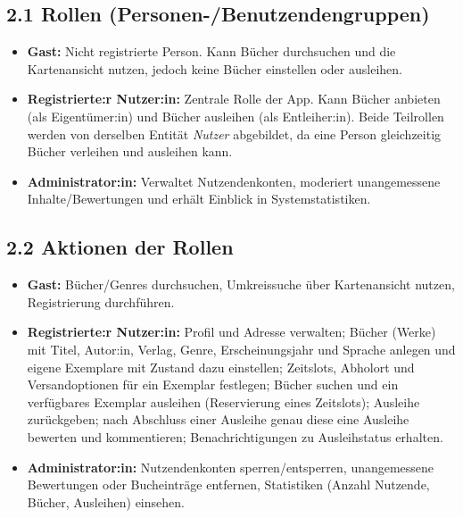 \documentclass[11pt,a4paper]{article}
\begin{document}
\subsection*{2.1 Rollen (Personen-/Benutzendengruppen)}
\begin{itemize}
    \item \textbf{Gast:} Nicht registrierte Person. Kann Bücher durchsuchen und die Kartenansicht nutzen, jedoch keine Bücher einstellen oder ausleihen.
    \item \textbf{Registrierte:r Nutzer:in:} Zentrale Rolle der App. Kann Bücher anbieten (als Eigentümer:in) und Bücher ausleihen (als Entleiher:in). Beide Teilrollen werden von derselben Entität \emph{Nutzer} abgebildet, da eine Person gleichzeitig Bücher verleihen und ausleihen kann.
    \item \textbf{Administrator:in:} Verwaltet Nutzendenkonten, moderiert unangemessene Inhalte/Bewertungen und erhält Einblick in Systemstatistiken.
\end{itemize}

\subsection*{2.2 Aktionen der Rollen}
\begin{itemize}
    \item \textbf{Gast:} Bücher/Genres durchsuchen, Umkreissuche über Kartenansicht nutzen, Registrierung durchführen.
    \item \textbf{Registrierte:r Nutzer:in:} Profil und Adresse verwalten; Bücher (Werke) mit Titel, Autor:in, Verlag, Genre, Erscheinungsjahr und Sprache anlegen und eigene Exemplare mit Zustand dazu einstellen; Zeitslots, Abholort und Versandoptionen für ein Exemplar festlegen; Bücher suchen und ein verfügbares Exemplar ausleihen (Reservierung eines Zeitslots); Ausleihe zurückgeben; nach Abschluss einer Ausleihe genau diese eine Ausleihe bewerten und kommentieren; Benachrichtigungen zu Ausleihstatus erhalten.
    \item \textbf{Administrator:in:} Nutzendenkonten sperren/entsperren, unangemessene Bewertungen oder Bucheinträge entfernen, Statistiken (Anzahl Nutzende, Bücher, Ausleihen) einsehen.
\end{itemize}
\end{document}
